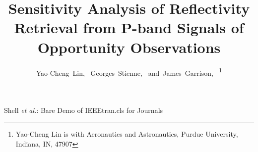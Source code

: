 \documentclass[draftcls]{IEEEtran}
\begin{document}
%
\title{Sensitivity Analysis of Reflectivity Retrieval from P-band Signals of Opportunity Observations}
%
%
%

\author{Yao-Cheng~Lin,~
        Georges~Stienne,~
        and~James~Garrison,~%
\thanks{Yao-Cheng Lin is with Aeronautics and Astronautics, Purdue University, Indiana,
IN, 47907}}

% 
%



%
{Shell \MakeLowercase{\textit{et al.}}: Bare Demo of IEEEtran.cls for Journals}
% 
\end{document}
